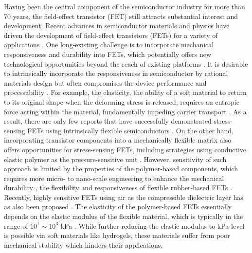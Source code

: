 Having been the central component of the semiconductor industry for
more than 70 years, the field-effect transistor (FET) still attracts 
substantial interest and development.
%
Recent advances in semiconductor materials and physics have driven the
development of field-effect transistors (FETs) for a variety of
applications \autocite{Torsi_2013_rev,Ben_Sasson_2014_fet_rev}.
%
One
long-existing challenge is to incorporate mechanical responsiveness
and durability into FETs, which potentially offers new technological
opportunities beyond the reach of existing platforms
\autocite{Someya_2004,Oh_2016_stretch_polym_FET,Shin_2017_air_FET}. 
%
It is
desirable to intrinsically incorporate the responsiveness in
semiconductor by rational materials design
\autocite{Oh_2016_stretch_polym_FET} but often compromises the device
performance and processability \autocite{Lee_2018}. For example, the
elasticity, the ability of a soft material to return to its original
shape when the deforming stress is released, requires an entropic
force acting within the material, fundamentally impeding carrier
transport \autocite{OConnor_2011_strain_P3HT}.
%
As a result, there are only few reports that have successfully
demonstrated stress-sensing FETs using intrinsically flexible
semiconductors \autocite{Oh_2016_stretch_polym_FET}. On the other hand,
incorporating transistor components into a mechanically flexible
matrix also offers opportunities for stress-sensing FETs, including
strategies using conductive elastic polymer as the pressure-sensitive
unit
\autocite{Someya_2004,Sekitani_2009,Kaltenbrunner_2013_elastic_device,Takei_2010_NW_skin}.
However, sensitivity of such approach is limited by the properties of
the polymer-based components, which requires more micro- to nano-scale
engineering to enhance the mechanical durability
\autocite{Jang_2015_soft_network}, the flexibility and responsiveness of
flexible rubber-based FETs
\autocite{Mannsfeld_2010_pressure,Schwartz_2013_polymer_transistor}.
Recently, highly sensitive FETs using air as the compressible
dielectric layer has as also been proposed
\autocite{Zang_2015_suspend_gate_FET,Shin_2017_air_FET}. The elasticity of
the polymer-based FETs essentially depends on the elastic modulus of
the flexible material, which is typically in the range of
\(10^{1}\sim{}10^{3}\) kPa \autocite{Amjadi_2016_stretchable_sensor}.
%
While further reducing the elastic modulus to kPa level is possible
via soft materials like hydrogels, these materials suffer from
 poor mechanical stability which hinders their applications.

